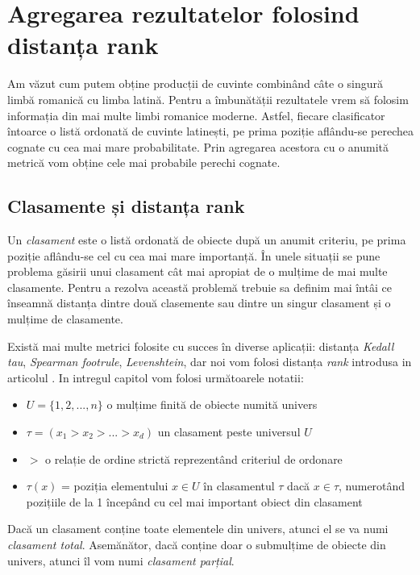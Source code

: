 \chapter{Agregarea rezultatelor folosind distanța rank}
Am văzut cum putem obține producții de cuvinte combinând câte o singură limbă romanică cu 
limba latină. Pentru a îmbunătății rezultatele vrem să folosim informația din mai multe 
limbi romanice moderne. Astfel, fiecare clasificator întoarce o listă ordonată de cuvinte latinești, 
pe prima poziție aflându-se perechea cognate cu cea mai mare probabilitate. Prin agregarea 
acestora cu o anumită metrică vom obține cele mai probabile perechi cognate.

\section{Clasamente și distanța rank}
Un \textit{clasament} este o listă ordonată de obiecte după un anumit criteriu, pe prima poziție 
aflându-se cel cu cea mai mare importanță. În unele situații se pune problema găsirii unui clasament
cât mai apropiat de o mulțime de mai multe clasamente. Pentru a rezolva această problemă trebuie sa
definim mai întâi ce înseamnă distanța dintre două clasemente sau dintre un singur clasament și o
mulțime de clasamente.

Există mai multe metrici folosite cu succes în diverse aplicații: distanța \textit{Kedall tau}, 
\textit{Spearman footrule}, \textit{Levenshtein}, dar noi vom folosi distanța \textit{rank}
introdusa in articolul \cite{rankdistance}. In intregul capitol vom folosi următoarele notatii:
\begin{itemize}
    \item $U = \{1, 2, ..., n\}$ o mulțime finită de obiecte numită univers 
    \item $\tau = (x_1 > x_2 > ... > x_d)$ un clasament peste universul $U$ 
    \item $>$ o relație de ordine strictă reprezentând criteriul de ordonare 
    \item $\tau(x)$ = poziția elementului $x \in U$ în clasamentul $\tau$ dacă $x \in \tau$, 
      numerotând pozițiile de la 1 începând cu cel mai important obiect din clasament
\end{itemize}

Dacă un clasament conține toate elementele din univers, atunci el se va numi 
\textit{clasament total}. Asemănător, dacă conține doar o submulțime de obiecte din univers, atunci
îl vom numi \textit{clasament parțial}.

